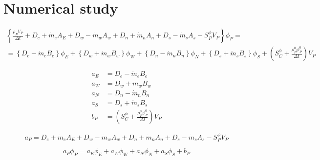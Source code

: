 
\section{Numerical study}












\begin{multline}
	\left\{
	\frac{\rho_P V_P}{\Delta t} + 
		D_e + \dot{m}_e A_E + D_w - \dot{m}_w A_w + D_n + \dot{m}_n A_n + D_s - \dot{m}_s A_s - S_P^\phi V_P
	\right\} \phi_P = \\
	= 
	\left\{ D_e - \dot{m}_e B_e \right\} \phi_E + 
	\left\{ D_w + \dot{m}_w B_w \right\} \phi_W + 
	\left\{ D_n - \dot{m}_n B_n \right\} \phi_N + 
	\left\{ D_s + \dot{m}_s B_s \right\} \phi_S + 
	\left( S_C^\phi + \frac{\rho_P^0 \phi_P^0}{\Delta t} \right) V_P
\end{multline}

\begin{align}
	a_E &= D_e - \dot{m}_e B_e \\
	a_W &= D_w + \dot{m}_w B_w \\
	a_N &= D_n - \dot{m}_n B_n \\
	a_S &= D_s + \dot{m}_s B_s \\
	b_P &= \left( S_C^\phi + \frac{\rho_P^0 \phi_P^0}{\Delta t} \right) V_P
\end{align}

\begin{equation}
	a_P = D_e + \dot{m}_e A_E + D_w - \dot{m}_w A_w + D_n + \dot{m}_n A_n + D_s - \dot{m}_s A_s - S_P^\phi V_P
\end{equation}

\begin{equation}
	a_P \phi_P = a_E \phi_E + a_W \phi_W + a_N \phi_N + a_S \phi_S + b_P
\end{equation}